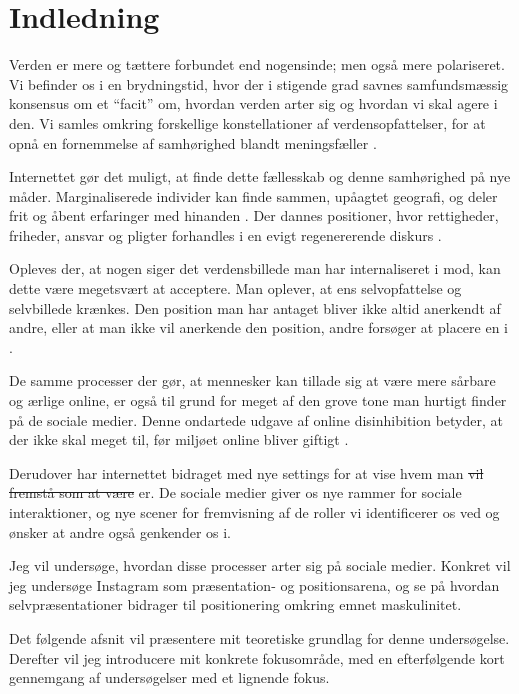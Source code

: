 \section{Indledning} 

Verden er mere og tættere forbundet end nogensinde; men også mere
polariseret. Vi befinder os i en brydningstid, hvor der i
stigende grad savnes samfundsmæssig konsensus om et “facit”
om, hvordan verden arter sig og hvordan vi skal agere i den.  Vi
samles omkring forskellige konstellationer af verdensopfattelser,
for at opnå en fornemmelse af samhørighed blandt
meningsfæller \autocite{sulerUniqueGroupsCyberspace1999}.

Internettet gør det muligt, at finde dette fællesskab og denne
samhørighed på nye måder. Marginaliserede individer kan finde
sammen, upåagtet geografi, og deler frit og åbent erfaringer med
hinanden \autocite[s. 184]{sulerOnlineDisinhibitionEffect2004}. 
Der dannes positioner, hvor rettigheder, friheder, ansvar og
pligter forhandles i en evigt regenererende diskurs \autocite[s.
22]{harrePositioningTheoryMoral1999}.

Opleves der, at nogen siger det verdensbillede man har
internaliseret i mod, kan dette være megetsvært at acceptere.
Man oplever, at ens selvopfattelse og selvbillede krænkes. Den
position man har antaget bliver ikke altid anerkendt af andre,
eller at man ikke vil anerkende den position, andre forsøger at
placere en i \autocite[s 30]{harrePositioningTheoryMoral1999}.

De samme processer der gør, at mennesker kan tillade sig at være
mere sårbare og ærlige online, er også til grund for meget af
den grove tone man hurtigt finder på de sociale medier. Denne 
ondartede udgave af online disinhibition betyder, at der ikke skal
meget til, før miljøet online bliver giftigt
\autocite{sulerOnlineDisinhibitionEffect2004}.

Derudover har internettet bidraget med nye settings for at vise 
hvem man \sout{vil fremstå som at være} er. De sociale medier 
giver os nye rammer for sociale interaktioner, og nye scener for 
fremvisning af de roller vi identificerer os ved og ønsker at 
andre også genkender os i.

Jeg vil undersøge, hvordan disse processer arter sig på sociale
medier. Konkret vil jeg undersøge Instagram som præsentation- og
positionsarena, og se på hvordan selvpræsentationer bidrager til 
positionering omkring emnet maskulinitet.

Det følgende afsnit vil præsentere mit teoretiske grundlag for
denne undersøgelse. Derefter vil jeg introducere mit konkrete
fokusområde, med en efterfølgende kort gennemgang af undersøgelser
med et lignende fokus.

